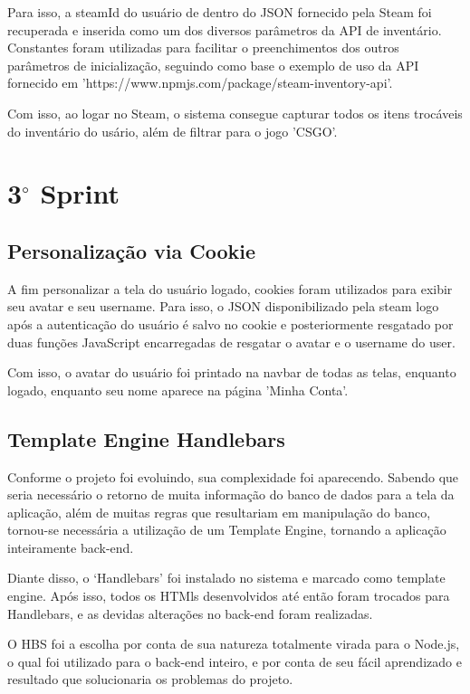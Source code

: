Para isso, a steamId do usuário de dentro do JSON fornecido pela Steam foi recuperada e inserida como um dos diversos parâmetros da API de 
inventário. Constantes foram utilizadas para facilitar o preenchimentos dos outros parâmetros de inicialização, seguindo como base o 
exemplo de uso da API fornecido em 'https://www.npmjs.com/package/steam-inventory-api'.

Com isso, ao logar no Steam, o sistema consegue capturar todos os itens trocáveis do inventário do usário, 
além de filtrar para o jogo 'CSGO'.


\section{3$^{\circ}$ Sprint}
\subsection{Personalização via Cookie}
A fim personalizar a tela do usuário logado, cookies foram utilizados para 
exibir seu avatar e seu username. Para isso, o JSON disponibilizado pela steam logo 
após a autenticação do usuário é salvo no cookie e posteriormente resgatado por duas 
funções JavaScript encarregadas de resgatar o avatar e o username do user.

Com isso, o avatar do usuário foi printado na navbar de todas as telas, enquanto logado, enquanto seu nome 
aparece na página 'Minha Conta'.

\subsection{Template Engine Handlebars}
Conforme o projeto foi evoluindo, sua complexidade foi aparecendo. Sabendo que seria necessário o retorno 
de muita informação do banco de dados para a tela da aplicação, além de muitas regras que resultariam 
em manipulação do banco, tornou-se necessária a utilização de um Template Engine, tornando a aplicação 
inteiramente back-end. 

Diante disso, o ‘Handlebars’ foi instalado no sistema e marcado como template engine. Após isso, todos 
os HTMls desenvolvidos até então foram trocados para Handlebars, e as devidas alterações no back-end 
foram realizadas.

O HBS foi a escolha por conta de sua natureza totalmente virada para o Node.js, o qual foi utilizado 
para o back-end inteiro, e por conta de seu fácil aprendizado e resultado que solucionaria os 
problemas do projeto.

